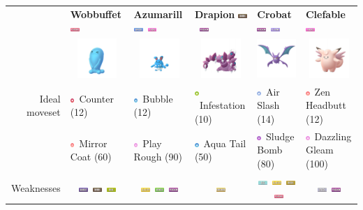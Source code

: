 \documentclass[8pt,aspectratio=169,compress]{beamer}
\newcommand{\bugfull}{\includegraphics[height=0.15cm]{../../images/type/full/Bug.png}}
\newcommand{\darkfull}{\includegraphics[height=0.15cm]{../../images/type/full/Dark.png}}
\newcommand{\electricfull}{\includegraphics[height=0.15cm]{../../images/type/full/Electric.png}}
\newcommand{\fairyfull}{\includegraphics[height=0.15cm]{../../images/type/full/Fairy.png}}
\newcommand{\flyingfull}{\includegraphics[height=0.15cm]{../../images/type/full/Flying.png}}
\newcommand{\ghostfull}{\includegraphics[height=0.15cm]{../../images/type/full/Ghost.png}}
\newcommand{\grassfull}{\includegraphics[height=0.15cm]{../../images/type/full/Grass.png}}
\newcommand{\groundfull}{\includegraphics[height=0.15cm]{../../images/type/full/Ground.png}}
\newcommand{\icefull}{\includegraphics[height=0.15cm]{../../images/type/full/Ice.png}}
\newcommand{\psychicfull}{\includegraphics[height=0.15cm]{../../images/type/full/Psychic.png}}
\newcommand{\rockfull}{\includegraphics[height=0.15cm]{../../images/type/full/Rock.png}}
\newcommand{\waterfull}{\includegraphics[height=0.15cm]{../../images/type/full/Water.png}}
\newcommand{\poisonfull}{\includegraphics[height=0.15cm]{../../images/type/full/Poison.png}}
\newcommand{\steelfull}{\includegraphics[height=0.15cm]{../../images/type/full/Steel.png}}
\newcommand{\fightingsimp}{\includegraphics[height=0.15cm]{../../images/type/simplified/fighting.png}}
\newcommand{\psysimp}{\includegraphics[height=0.15cm]{../../images/type/simplified/psy.png}}
\newcommand{\watersimp}{\includegraphics[height=0.15cm]{../../images/type/simplified/water.png}}
\newcommand{\fairysimp}{\includegraphics[height=0.15cm]{../../images/type/simplified/fairy.png}}
\newcommand{\flyingsimp}{\includegraphics[height=0.15cm]{../../images/type/simplified/flying.png}}
\newcommand{\poisonsimp}{\includegraphics[height=0.15cm]{../../images/type/simplified/poison.png}}
\newcommand{\bugsimp}{\includegraphics[height=0.15cm]{../../images/type/simplified/bug.png}}
\begin{document}
\begin{frame}
\begin{block}{}
\begin{tiny}
\begin{itemize}
\begin{center}
\begin{tabular}{rp{1.9cm}p{1.9cm}p{1.9cm}p{1.9cm}p{1.9cm}}
& \textbf{Wobbuffet} \hfill \psychicfull & \textbf{Azumarill} \hfill\waterfull~\fairyfull & \textbf{Drapion} \hfill \darkfull~\poisonfull & \textbf{Crobat} \hfill \poisonfull~\flyingfull & \textbf{Clefable} \hfill \fairyfull \\
&\multicolumn{1}{c}{\includegraphics[width=1.5cm]{../../images/pokemon/Wobbuffet}} &
\multicolumn{1}{c}{\includegraphics[width=1.5cm]{../../images/pokemon/Azumarill}} &
\multicolumn{1}{c}{\includegraphics[width=1.5cm]{../../images/pokemon/Drapion}} &
\multicolumn{1}{c}{\includegraphics[width=1.5cm]{../../images/pokemon/Crobat}} &
\multicolumn{1}{c}{\includegraphics[width=1.5cm]{../../images/pokemon/Clefable}}  \\ \hline
Ideal moveset & \fightingsimp~Counter (12) & \watersimp~Bubble (12)& \bugsimp~Infestation (10) & \flyingsimp~Air Slash (14) & \psysimp~Zen Headbutt (12) \\
& \psysimp~Mirror Coat (60)&  \fairysimp~Play Rough (90) &  \watersimp~Aqua Tail (50) & \poisonsimp~Sludge Bomb (80) & \fairysimp~Dazzling Gleam (100) \\ \hline
Weaknesses  & \multicolumn{1}{c}{\ghostfull~\darkfull~\bugfull}  & \multicolumn{1}{c}{\electricfull~\grassfull~\poisonfull}  &  \multicolumn{1}{c}{\groundfull} & \multicolumn{1}{c}{\icefull~\electricfull~\rockfull~\psychicfull} & \multicolumn{1}{c}{\steelfull~\poisonfull} \\
\end{tabular}
\end{center}
  
\end{itemize}




\end{tiny}
\end{block}
\end{frame}
\end{document}
